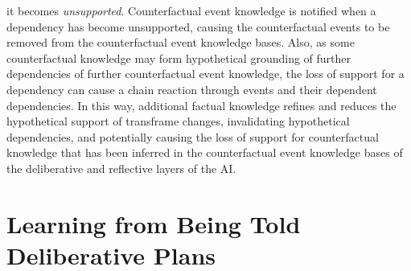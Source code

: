 it becomes \emph{unsupported}.  Counterfactual event knowledge is
notified when a dependency has become unsupported, causing the
counterfactual events to be removed from the counterfactual event
knowledge bases.  Also, as some counterfactual knowledge may form
hypothetical grounding of further dependencies of further
counterfactual event knowledge, the loss of support for a dependency
can cause a chain reaction through events and their dependent
dependencies.  In this way, additional factual knowledge refines and
reduces the hypothetical support of transframe changes, invalidating
hypothetical dependencies, and potentially causing the loss of support
for counterfactual knowledge that has been inferred in the
counterfactual event knowledge bases of the deliberative and
reflective layers of the AI.

\section{Learning from Being Told Deliberative Plans}

